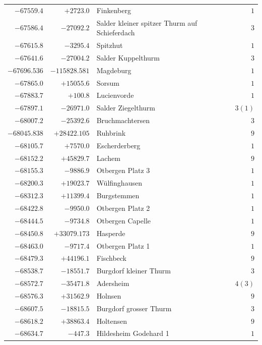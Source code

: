 \begin{center}
\begin{tabular}{r|r|p{170pt}|r}
\(-67559.4\)&\(+2723.0\)&Finkenberg&\(1\)\\
\(-67586.4\)&\(-27092.2\)&Salder kleiner spitzer Thurm auf Schieferdach&\(3\)\\
\(-67615.8\)&\(-3295.4\)&Spitzhut&\(1\)\\
\(-67641.6\)&\(-27004.2\)&Salder Kuppelthurm&\(3\)\\
\(-67696.536\)&\(-115828.581\)&Magdeburg&\(1\)\\
\(-67865.0\)&\(+15055.6\)&Sorsum&\(1\)\\
\(-67883.7\)&\(+100.8\)&Lucienvorde&\(1\)\\
\(-67897.1\)&\(-26971.0\)&Salder Ziegelthurm&\(3 (1)\)\\
\(-68007.2\)&\(-25392.6\)&Bruchmachtersen&\(3\)\\
\(-68045.838\)&\(+28422.105\)&Ruhbrink&\(9\)\\
\(-68105.7\)&\(+7570.0\)&Escherderberg&\(1\)\\
\(-68152.2\)&\(+45829.7\)&Lachem&\(9\)\\
\(-68155.3\)&\(-9886.9\)&Otbergen Platz 3&\(1\)\\
\(-68200.3\)&\(+19023.7\)&Wülfinghausen&\(1\)\\
\(-68312.3\)&\(+11399.4\)&Burgstemmen&\(1\)\\
\(-68422.8\)&\(-9950.0\)&Otbergen Platz 2&\(1\)\\
\(-68444.5\)&\(-9734.8\)&Otbergen Capelle&\(1\)\\
\(-68450.8\)&\(+33079.173\)&Hasperde&\(9\)\\
\(-68463.0\)&\(-9717.4\)&Otbergen Platz 1&\(1\)\\
\(-68479.3\)&\(+44196.1\)&Fischbeck&\(9\)\\
\(-68538.7\)&\(-18551.7\)&Burgdorf kleiner Thurm&\(3\)\\
\(-68572.7\)&\(-35471.8\)&Adersheim&\(4 (3)\)\\
\(-68576.3\)&\(+31562.9\)&Holnsen&\(9\)\\
\(-68607.5\)&\(-18815.5\)&Burgdorf grosser Thurm&\(3\)\\
\(-68618.2\)&\(+38863.4\)&Holtensen&\(9\)\\
\(-68634.7\)&\(-447.3\)&Hildesheim Godehard 1&\(1\)\\
\hline\end{tabular}\endgroup\end{center}
